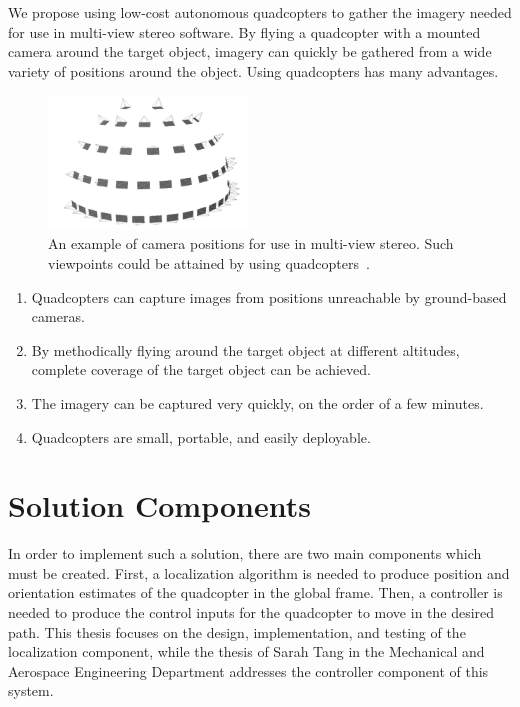We propose using low-cost autonomous quadcopters to gather the imagery needed for use in multi-view stereo software. By flying a quadcopter with a mounted camera around the target object, imagery can quickly be gathered from a wide variety of positions around the object. Using quadcopters has many advantages.

\begin{figure}
\centering
\includegraphics[width=200px]{../images/camera_network.png}
\caption{An example of camera positions for use in multi-view stereo. Such viewpoints could be attained by using quadcopters~\cite{Irschara}.}
\end{figure}

\begin{enumerate}
\item
Quadcopters can capture images from positions unreachable by ground-based cameras.

\item
By methodically flying around the target object at different altitudes, complete coverage of the target object can be achieved.

\item
The imagery can be captured very quickly, on the order of a few minutes.

\item
Quadcopters are small, portable, and easily deployable.


\end{enumerate}

\section{Solution Components}

In order to implement such a solution, there are two main components which must be created. First, a localization algorithm is needed to produce position and orientation estimates of the quadcopter in the global frame. Then, a controller is needed to produce the control inputs for the quadcopter to move in the desired path. This thesis focuses on the design, implementation, and testing of the localization component, while the thesis of Sarah Tang in the Mechanical and Aerospace Engineering Department addresses the controller component of this system.






